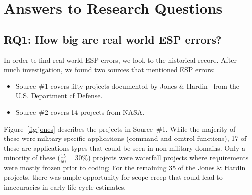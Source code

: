 \documentclass[final,twocolumn]{elsarticle}
\newcommand{\bi}{\begin{itemize}[leftmargin=0.4cm]}
\newcommand{\ei}{\end{itemize}}
\newcommand{\fig}[1]{Figure~\ref{fig:#1}}
\theoremstyle{break}
\begin{document}
\section{Answers to Research Questions}
\subsection{ RQ1: How big are real world ESP errors?}

In order to find real-world ESP errors,  we look to the historical record.
After much investigation, we found two sources that mentioned ESP errors:
\bi
\item Source~\#1 covers fifty projects documented
by Jones \& Hardin~\cite{jones07a} from the U.S.
Department of Defense.
\item Source~\#2 covers 14 projects  from NASA. 
  \ei
  \fig{jones} describes the projects in Source~\#1.
  While the majority of
these were military-specific applications (command
and control functions), 17 of these are applications
types that could be seen in non-military domains.
 Only a minority of
these ($\frac{15}{50}=30\%$) projects were waterfall
projects where requirements were mostly frozen prior
to coding;
  For the remaining 35 of the Jones \& Hardin projects, there was ample opportunity
  for scope creep that could lead to inaccuracies in early life cycle estimates.
\end{document}

